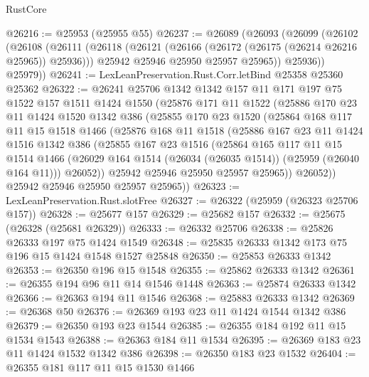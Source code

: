 \begin{lexlean}{RustCore}
\begin{coremodule}
@26216 := @25953 (@25955 @55)
@26237 := @26089
    (@26093
      (@26099
        (@26102
          (@26108
            (@26111
              (@26118
                (@26121 (@26166 (@26172 (@26175 (@26214 @26216 @25965)) @25936)))
                @25942
                @25946
                @25950
                @25957
                @25965))
            @25936))
        @25979))
@26241 := LexLeanPreservation.Rust.Corr.letBind @25358 @25360 @25362
@26322 := @26241
    @25706
    @1342
    @1342
    @157
    @11
    @171
    @197
    @75
    @1522
    @157
    @1511
    @1424
    @1550
    (@25876
      @171
      @11
      @1522
      (@25886
        @170
        @23
        @11
        @1424
        @1520
        @1342
        @386
        (@25855
          @170
          @23
          @1520
          (@25864
            @168
            @117
            @11
            @15
            @1518
            @1466
            (@25876
              @168
              @11
              @1518
              (@25886
                @167
                @23
                @11
                @1424
                @1516
                @1342
                @386
                (@25855
                  @167
                  @23
                  @1516
                  (@25864
                    @165
                    @117
                    @11
                    @15
                    @1514
                    @1466
                    (@26029 @164 @1514 (@26034 (@26035 @1514)) (@25959 (@26040 @164 @11)))
                    @26052))
                @25942
                @25946
                @25950
                @25957
                @25965))
            @26052))
        @25942
        @25946
        @25950
        @25957
        @25965))
@26323 := LexLeanPreservation.Rust.slotFree
@26327 := @26322 (@25959 (@26323 @25706 @157))
@26328 := @25677 @157
@26329 := @25682 @157
@26332 := @25675 (@26328 (@25681 @26329))
@26333 := @26332 @25706
@26338 := @25826 @26333 @197 @75 @1424 @1549
@26348 := @25835 @26333 @1342 @173 @75 @196 @15 @1424 @1548 @1527 @25848
@26350 := @25853 @26333 @1342
@26353 := @26350 @196 @15 @1548
@26355 := @25862 @26333 @1342
@26361 := @26355 @194 @96 @11 @14 @1546 @1448
@26363 := @25874 @26333 @1342
@26366 := @26363 @194 @11 @1546
@26368 := @25883 @26333 @1342
@26369 := @26368 @50
@26376 := @26369 @193 @23 @11 @1424 @1544 @1342 @386
@26379 := @26350 @193 @23 @1544
@26385 := @26355 @184 @192 @11 @15 @1534 @1543
@26388 := @26363 @184 @11 @1534
@26395 := @26369 @183 @23 @11 @1424 @1532 @1342 @386
@26398 := @26350 @183 @23 @1532
@26404 := @26355 @181 @117 @11 @15 @1530 @1466

\end{coremodule}
\end{lexlean}
